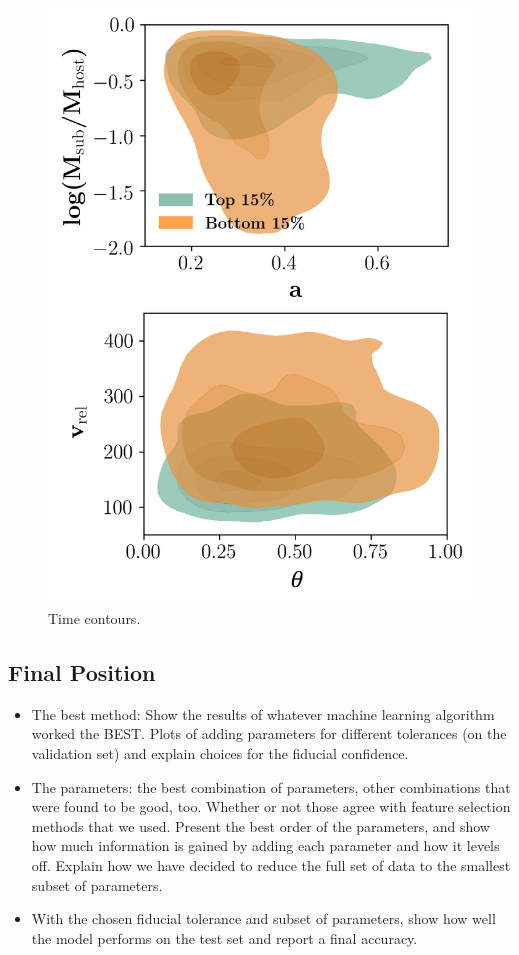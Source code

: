 \documentclass[fleqn,usenatbib]{mnras}
\begin{document}
\begin{figure}
	\includegraphics[width=\textwidth]{Figures/time_contours}
    \caption{Time contours.}
    \label{fig:time_contours}
\end{figure}

\subsection{Final Position}
\label{sec:position}
\begin{itemize}
	\item The best method: Show the results of whatever machine learning algorithm worked the BEST. Plots of adding parameters for different tolerances (on the validation set) and explain choices for the fiducial confidence.
    \item The parameters: the best combination of parameters, other combinations that were found to be good, too. Whether or not those agree with feature selection methods that we used. Present the best order of the parameters, and show how much information is gained by adding each parameter and how it levels off. Explain how we have decided to reduce the full set of data to the smallest subset of parameters.
    \item With the chosen fiducial tolerance and subset of parameters, show how well the model performs on the test set and report a final accuracy.
\end{itemize}
\end{document}
